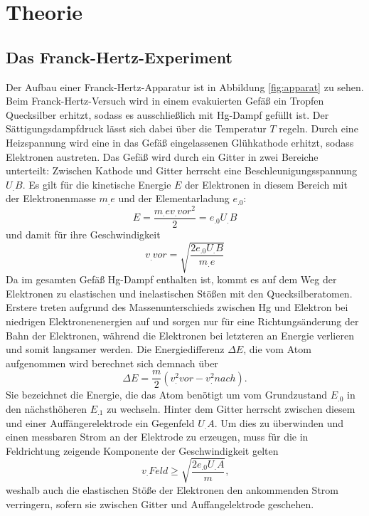 
\section{Theorie}
\label{sec:Theorie}

\subsection{Das Franck-Hertz-Experiment}
Der Aufbau einer Franck-Hertz-Apparatur ist in Abbildung \ref{fig:apparat} zu sehen.
Beim Franck-Hertz-Versuch wird in einem evakuierten Gefäß ein Tropfen Quecksilber erhitzt, sodass es ausschließlich mit Hg-Dampf gefüllt ist. Der Sättigungsdampfdruck lässt sich dabei über die Temperatur $T$ regeln.
Durch eine Heizspannung wird eine in das Gefäß eingelassenen Glühkathode erhitzt, sodass Elektronen austreten. 
Das Gefäß wird durch ein Gitter in zwei Bereiche unterteilt:
Zwischen Kathode und Gitter herrscht eine Beschleunigungsspannung $U_.B$.
Es gilt für die kinetische Energie $E$ der Elektronen in diesem Bereich mit der Elektronenmasse $m_.e$ und der Elementarladung $e_.0$:
\begin{equation*}
E=\frac{m_.ev_.{vor^2}}{2}=e_.0U_.B
\end{equation*}
und damit für ihre Geschwindigkeit
\begin{equation}
v_.{vor}=\sqrt{\frac{2e_.0U_.B}{m_.e}\label{eq:v}}
\end{equation}
Da im gesamten Gefäß Hg-Dampf enthalten ist, kommt es auf dem Weg der Elektronen zu elastischen und inelastischen Stößen mit den Quecksilberatomen. Erstere treten aufgrund des Massenunterschieds zwischen Hg und Elektron bei niedrigen Elektronenenergien auf und sorgen nur für eine Richtungsänderung der Bahn der Elektronen, während die Elektronen bei letzteren an Energie verlieren und somit langsamer werden.
Die Energiedifferenz $\Delta E$, die vom Atom aufgenommen wird berechnet sich demnach über
\[
\Delta E = \frac{m}{2}\left(v^2_.{vor}-v^2_.{nach}\right)\text{.}\label{eq:DeltaE}
\]
Sie bezeichnet die Energie, die das Atom benötigt um vom Grundzustand $E_.0$ in den nächsthöheren $E_.1$ zu wechseln.
Hinter dem Gitter herrscht zwischen diesem und einer Auffängerelektrode ein Gegenfeld $U_.A$.
Um dies zu überwinden und einen messbaren Strom an der Elektrode zu erzeugen, muss für die in Feldrichtung zeigende Komponente der Geschwindigkeit gelten
\[
v_.{Feld}\geq \sqrt{\frac{2e_.0U_.A}{m}}\text{,}
\]
weshalb auch die elastischen Stöße der Elektronen den ankommenden Strom verringern, sofern sie zwischen Gitter und Auffangelektrode geschehen.
